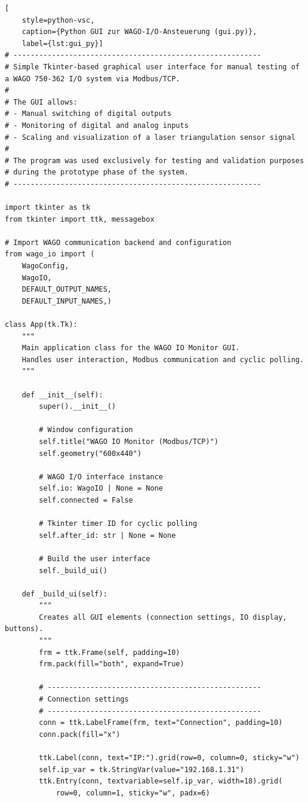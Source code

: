\begin{lstlisting}[
    style=python-vsc,
    caption={Python GUI zur WAGO-I/O-Ansteuerung (gui.py)},
    label={lst:gui_py}]
# ----------------------------------------------------------
# Simple Tkinter-based graphical user interface for manual testing of a WAGO 750-362 I/O system via Modbus/TCP.
#
# The GUI allows:
# - Manual switching of digital outputs
# - Monitoring of digital and analog inputs
# - Scaling and visualization of a laser triangulation sensor signal
#
# The program was used exclusively for testing and validation purposes
# during the prototype phase of the system.
# ----------------------------------------------------------

import tkinter as tk
from tkinter import ttk, messagebox

# Import WAGO communication backend and configuration
from wago_io import (
    WagoConfig,
    WagoIO,
    DEFAULT_OUTPUT_NAMES,
    DEFAULT_INPUT_NAMES,)

class App(tk.Tk):
    """
    Main application class for the WAGO IO Monitor GUI.
    Handles user interaction, Modbus communication and cyclic polling.
    """

    def __init__(self):
        super().__init__()

        # Window configuration
        self.title("WAGO IO Monitor (Modbus/TCP)")
        self.geometry("600x440")

        # WAGO I/O interface instance
        self.io: WagoIO | None = None
        self.connected = False

        # Tkinter timer ID for cyclic polling
        self.after_id: str | None = None

        # Build the user interface
        self._build_ui()

    def _build_ui(self):
        """
        Creates all GUI elements (connection settings, IO display, buttons).
        """
        frm = ttk.Frame(self, padding=10)
        frm.pack(fill="both", expand=True)

        # --------------------------------------------------
        # Connection settings
        # --------------------------------------------------
        conn = ttk.LabelFrame(frm, text="Connection", padding=10)
        conn.pack(fill="x")

        ttk.Label(conn, text="IP:").grid(row=0, column=0, sticky="w")
        self.ip_var = tk.StringVar(value="192.168.1.31")
        ttk.Entry(conn, textvariable=self.ip_var, width=18).grid(
            row=0, column=1, sticky="w", padx=6)


\end{lstlisting}
